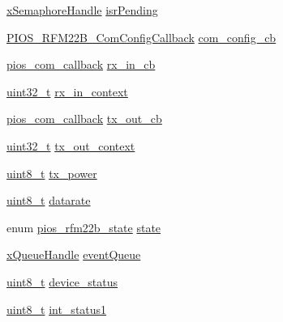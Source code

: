 \begin{DoxyCompactItemize}
\item 
\hyperlink{_common_2_libraries_2_free_r_t_o_s_2_source_2include_2semphr_8h_aa91aa1b6835a184838f9ccf138a6ad10}{x\-Semaphore\-Handle} \hyperlink{structpios__rfm22b__dev_a9e681596408e8e6d5387ecdd43acfe62}{isr\-Pending}
\item 
\hyperlink{group___p_i_o_s___r_f_m22_b_gaa8a316480e010f5e383d29257c0686cd}{P\-I\-O\-S\-\_\-\-R\-F\-M22\-B\-\_\-\-Com\-Config\-Callback} \hyperlink{structpios__rfm22b__dev_abed55ffe3e0e2832d958e692f9310b6e}{com\-\_\-config\-\_\-cb}
\item 
\hyperlink{group___p_i_o_s___c_o_m_ga23f1888821f1f74a50c02adc459df597}{pios\-\_\-com\-\_\-callback} \hyperlink{structpios__rfm22b__dev_ac170322ec2f96932e0f060aa68b6bd12}{rx\-\_\-in\-\_\-cb}
\item 
\hyperlink{stdint_8h_a435d1572bf3f880d55459d9805097f62}{uint32\-\_\-t} \hyperlink{structpios__rfm22b__dev_a70fce9f445ae6ec87f5a559b89e82169}{rx\-\_\-in\-\_\-context}
\item 
\hyperlink{group___p_i_o_s___c_o_m_ga23f1888821f1f74a50c02adc459df597}{pios\-\_\-com\-\_\-callback} \hyperlink{structpios__rfm22b__dev_ab861d6c14abc749f20e45226bd606840}{tx\-\_\-out\-\_\-cb}
\item 
\hyperlink{stdint_8h_a435d1572bf3f880d55459d9805097f62}{uint32\-\_\-t} \hyperlink{structpios__rfm22b__dev_a6d55d5cf2cee09fb6e56c1f918dc31ea}{tx\-\_\-out\-\_\-context}
\item 
\hyperlink{stdint_8h_aba7bc1797add20fe3efdf37ced1182c5}{uint8\-\_\-t} \hyperlink{structpios__rfm22b__dev_a3ca116567675ce2311161483fe4c9ff4}{tx\-\_\-power}
\item 
\hyperlink{stdint_8h_aba7bc1797add20fe3efdf37ced1182c5}{uint8\-\_\-t} \hyperlink{structpios__rfm22b__dev_aff7a6133350534d9bdb99e8e4856dd6e}{datarate}
\item 
enum \hyperlink{group___p_i_o_s___r_f_m22_b_gaf31f5344b7afb099b3105bfff4debdca}{pios\-\_\-rfm22b\-\_\-state} \hyperlink{structpios__rfm22b__dev_a2725ce50c0aad0fae1e4cee8e29072f7}{state}
\item 
\hyperlink{_common_2_libraries_2_free_r_t_o_s_2_source_2include_2queue_8h_a229037f755b756156e34a440ce134b8b}{x\-Queue\-Handle} \hyperlink{structpios__rfm22b__dev_a0c5971f25ea4ab50328105098e54eda7}{event\-Queue}
\item 
\hyperlink{stdint_8h_aba7bc1797add20fe3efdf37ced1182c5}{uint8\-\_\-t} \hyperlink{structpios__rfm22b__dev_aa6ea2086a901b33a1f0f1535f378cdfc}{device\-\_\-status}
\item 
\hyperlink{stdint_8h_aba7bc1797add20fe3efdf37ced1182c5}{uint8\-\_\-t} \hyperlink{structpios__rfm22b__dev_a9a3b8dfbadc7d813f3f9a2e9a40373f7}{int\-\_\-status1}

\end{DoxyCompactItemize}
